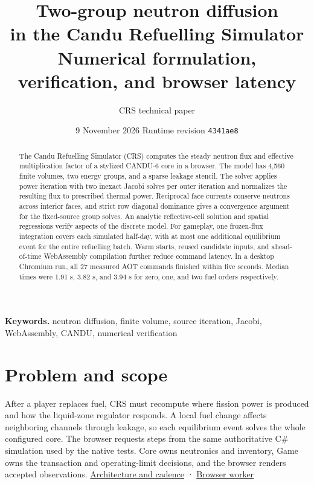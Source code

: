 \documentclass[11pt,letterpaper]{article}
\title{\textbf{Two-group neutron diffusion}\\
       \textbf{in the Candu Refuelling Simulator}\\[0.35em]
       \large Numerical formulation, verification, and browser latency}
\author{CRS technical paper}
\date{9 November 2026 \enspace\textperiodcentered\enspace Runtime revision \texttt{4341ae8}}
\begin{document}
\maketitle

\begin{abstract}
The Candu Refuelling Simulator (CRS) computes the steady neutron flux and effective
multiplication factor of a stylized CANDU-6 core in a browser. The model has 4,560
finite volumes, two energy groups, and a sparse leakage stencil. The solver applies
power iteration with two inexact Jacobi solves per outer iteration and normalizes the
resulting flux to prescribed thermal power. Reciprocal face currents conserve neutrons
across interior faces, and strict row diagonal dominance gives a convergence argument
for the fixed-source group solves. An analytic reflective-cell solution and spatial
regressions verify aspects of the discrete model. For gameplay, one frozen-flux
integration covers each simulated half-day, with at most one additional equilibrium
event for the entire refuelling batch. Warm starts, reused candidate inputs, and
ahead-of-time WebAssembly compilation further reduce command latency. In a desktop
Chromium run, all 27 measured AOT commands finished within five seconds. Median times
were 1.91 s, 3.82 s, and 3.94 s for zero, one, and two fuel orders respectively.
\end{abstract}

\noindent\textbf{Keywords.} neutron diffusion, finite volume, source iteration, Jacobi, WebAssembly, CANDU,
numerical verification

\section{Problem and scope}\label{problem-and-scope}

After a player replaces fuel, CRS must recompute where fission power is produced and how
the liquid-zone regulator responds. A local fuel change affects neighboring channels
through leakage, so each equilibrium event solves the whole configured core. The browser
requests steps from the same authoritative C\# simulation used by the native tests. Core
owns neutronics and inventory, Game owns the transaction and operating-limit decisions,
and the browser renders accepted observations.
\href{https://github.com/hkkho/CRS/blob/4341ae8881f5827988c3d8b1859aa9e8f13cd8a6/docs/IMPLEMENTATION_GUIDE.md}{Architecture
and cadence} ·
\href{https://github.com/hkkho/CRS/blob/4341ae8881f5827988c3d8b1859aa9e8f13cd8a6/web/candu-playtest/src/wasmWorker.ts}{Browser
worker}
\end{document}
